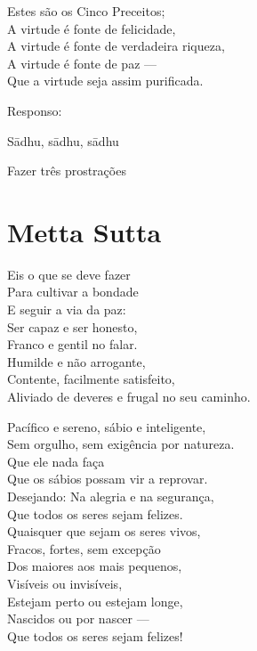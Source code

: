 \documentclass[
  babelLanguage=portuguese,
  final,
]{chantingbook}
\begin{document}
\begin{english}
  Estes são os Cinco Preceitos;\\
  A virtude é fonte de felicidade,\\
  A virtude é fonte de verdadeira riqueza,\\
  A virtude é fonte de paz ---\\
  Que a virtude seja assim purificada.
\end{english}

\begin{instruction}
  Responso:
\end{instruction}

Sādhu, sādhu, sādhu

\begin{instruction}
  Fazer três prostrações
\end{instruction}

\artoptfalse

\chapter[Metta Sutta]{Metta Sutta}

\begin{leader}
\end{leader}

Eis o que se deve fazer\\
Para cultivar a bondade\\
E seguir a via da paz:\\
Ser capaz e ser honesto,\\
Franco e gentil no falar.\\
Humilde e não arrogante,\\
Contente, facilmente satisfeito,\\
Aliviado de deveres e frugal no seu caminho.

Pacífico e sereno, sábio e inteligente,\\
Sem orgulho, sem exigência por natureza.\\
Que ele nada faça\\
Que os sábios possam vir a reprovar.\\
Desejando: Na alegria e na segurança,\\
Que todos os seres sejam felizes.\\
Quaisquer que sejam os seres vivos,\\
Fracos, fortes, sem excepção\\
Dos maiores aos mais pequenos,\\
Visíveis ou invisíveis,\\
Estejam perto ou estejam longe,\\
Nascidos ou por nascer ---\\
Que todos os seres sejam felizes!
\end{document}
